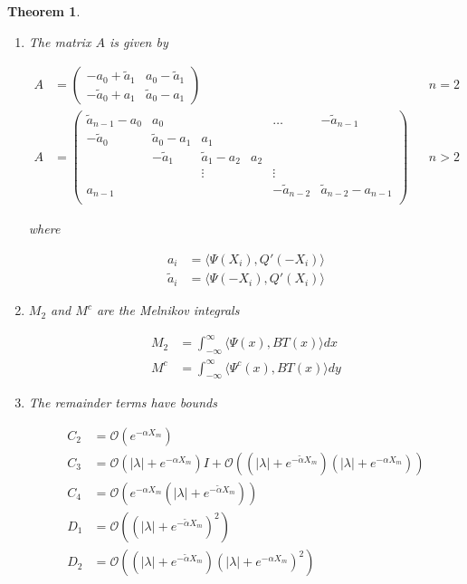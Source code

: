 \documentclass[12pt]{article}
\newtheorem{theorem}{Theorem}
\begin{document}
\begin{theorem}
\begin{enumerate}
where $\nu(\lambda)$ is the small eigenvalue of the asympotic matrix $A_\infty + B \lambda$.

\item The matrix $A$ is given by

\begin{align*}
A &= \begin{pmatrix}
-a_0 + \tilde{a}_1 & a_0 - \tilde{a}_1 \\
-\tilde{a}_0 + a_1 & \tilde{a}_0 - a_1
\end{pmatrix} && n = 2 \\
A &= \begin{pmatrix}
\tilde{a}_{n-1} - a_0 & a_0 & & & \dots & -\tilde{a}_{n-1}\\
-\tilde{a}_0 & \tilde{a}_0 - a_1 &  a_1 \\
& -\tilde{a}_1 & \tilde{a}_1 - a_2 &  a_2 \\
& & \vdots & & \vdots \\
a_{n-1} & & & & -\tilde{a}_{n-2} & \tilde{a}_{n-2} - a_{n-1} \\
\end{pmatrix} && n > 2
\end{align*}

where

\begin{align*}
a_i &= \langle \Psi(X_i), Q'(-X_i) \rangle \\
\tilde{a}_i &= \langle \Psi(-X_i), Q'(X_i) \rangle
\end{align*}

\item $M_2$ and $M^c$ are the Melnikov integrals

\begin{align*}
M_2 &= \int_{-\infty}^\infty \langle \Psi(x), B T(x) \rangle dx \\
M^c &= \int_{-\infty}^\infty \langle \Psi^c(x), B T(x) \rangle dy
\end{align*}

\item The remainder terms have bounds

\begin{align*}
C_2 &= \mathcal{O}(e^{-\alpha X_m}) \\
C_3 &= \mathcal{O}(|\lambda| + e^{-\alpha X_m}) I
+ \mathcal{O}((|\lambda| + e^{-\tilde{\alpha} X_m})( |\lambda| + e^{-\alpha X_m}))\\
C_4 &= \mathcal{O}(e^{-\alpha X_m}(|\lambda| + e^{-\tilde{\alpha} X_m})) \\
D_1 &= \mathcal{O}((|\lambda| + e^{-\tilde{\alpha} X_m})^2) \\
D_2 &= \mathcal{O}((|\lambda| + e^{-\tilde{\alpha} X_m})(|\lambda| + e^{-\alpha X_m})^2) 
\end{align*}


\end{enumerate}
\end{theorem}
\end{document}
